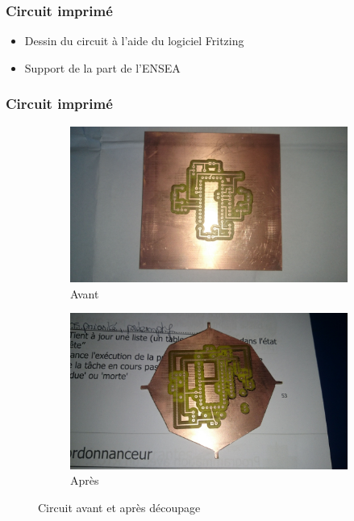 \documentclass{beamer}
\begin{document}
{	\begin{frame}
	  \frametitle{Circuit imprimé}
	  
	  \begin{itemize}
	    \item Dessin du circuit à l'aide du logiciel Fritzing
	    \item Support de la part de l'ENSEA
	  \end{itemize}
	\end{frame}
	
	\begin{frame}
	  \frametitle{Circuit imprimé}

	    \begin{figure}
	      \begin{subfigure}{.5\textwidth}
		\centering
		\includegraphics[scale=0.04]{img/carte_avant.jpg}
		\caption{Avant}
		\label{fig:sfig1}
	      \end{subfigure}%
	      \begin{subfigure}{.5\textwidth}
		\centering
		\includegraphics[scale=0.04]{img/carte_apres.jpg}
		\caption{Après}
		\label{fig:sfig2}
	      \end{subfigure}
	      \caption{Circuit avant et après découpage}
	      \label{fig:fig}
	    \end{figure}
	  \end{frame}
	
}
\end{document}
